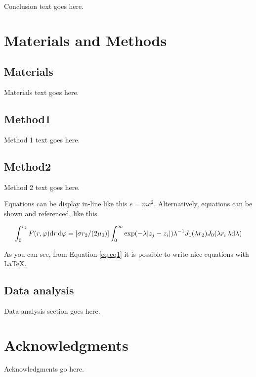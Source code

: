 \documentclass[11pt,a4paper]{article}
\begin{document}
Conclusion text goes here.
\lipsum[5]

\section*{Materials and Methods}

\subsection*{Materials} 
Materials text goes here.
\lipsum[3]
 
\subsection*{Method1}  
Method 1 text goes here.
\lipsum[3]

\subsection*{Method2}
Method 2 text goes here.
\lipsum[3]

Equations can be display in-line like this $e = mc^2$.
Alternatively, equations can be shown and referenced, like this.

\begin{equation}
    \int^{r_2}_0 F(r,\varphi){\rm d}r\,{\rm d}\varphi = [\sigma r_2/(2\mu_0)] \int^{\infty}_0\exp(-\lambda|z_j-z_i|)\lambda^{-1}J_1 (\lambda r_2)J_0 (\lambda r_i\,\lambda {\rm d}\lambda)
    \label{eq:eq1}
\end{equation}

As you can see, from Equation \ref{eq:eq1} it is possible to write nice equations with \LaTeX.

\subsection*{Data analysis}
Data analysis section goes here.
\lipsum[3]

\section*{Acknowledgments}
Acknowledgments go here.

\newpage


\end{document}
